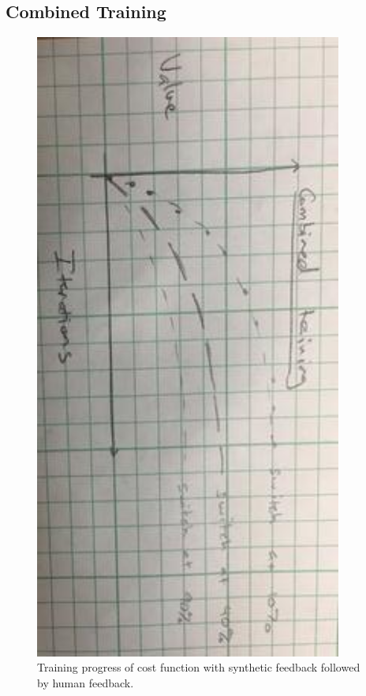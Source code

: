 \subsection{Combined Training}
\begin{figure}[h]
    \centering
    \includegraphics[width=0.9\textwidth]{Images/ToyCombinedTraining.jpg}
    \caption{Training progress of cost function with synthetic feedback followed by human feedback.}
    \label{fig:ToyCombinedTraningProgress}
\end{figure}


